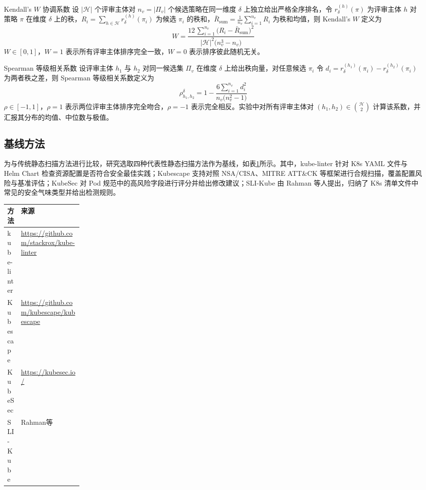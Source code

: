 \begin{flatdefinition}{Kendall's $W$ 协调系数}
\label{def:kendalls-w}
设 $|\mathcal{H}|$ 个评审主体对 $n_v=|\Pi_v|$ 个候选策略在同一维度 $\delta$ 上独立给出严格全序排名，令 $r_{\delta}^{(h)}(\pi)$ 为评审主体 $h$ 对策略 $\pi$ 在维度 $\delta$ 上的秩，$R_i=\sum_{h\in\mathcal{H}}r_{\delta}^{(h)}(\pi_i)$ 为候选 $\pi_i$ 的秩和，$\bar{R}_{\mathrm{sum}}=\frac{1}{n_v}\sum_{i=1}^{n_v}R_i$ 为秩和均值，则 Kendall's $W$ 定义为
\begin{equation}\label{eq:kendalls-w}
W = \frac{12\,\sum_{i=1}^{n_v}\bigl(R_i - \bar{R}_{\mathrm{sum}}\bigr)^{2}}{|\mathcal{H}|^{2}\bigl(n_v^{3}-n_v\bigr)}
\end{equation}
$W\in[0,1]$，$W=1$ 表示所有评审主体排序完全一致，$W=0$ 表示排序彼此随机无关。
\end{flatdefinition}

\begin{flatdefinition}{Spearman 等级相关系数}
\label{def:spearman-rho}
设评审主体 $h_1$ 与 $h_2$ 对同一候选集 $\Pi_v$ 在维度 $\delta$ 上给出秩向量，对任意候选 $\pi_i$ 令 $d_i=r_{\delta}^{(h_1)}(\pi_i)-r_{\delta}^{(h_2)}(\pi_i)$ 为两者秩之差，则 Spearman 等级相关系数定义为
\begin{equation}\label{eq:spearman-rho}
\rho_{h_1,h_2}^{\delta} = 1 - \frac{6\displaystyle\sum_{i=1}^{n_v}d_i^{2}}{n_v\bigl(n_v^{2}-1\bigr)}
\end{equation}
$\rho\in[-1,1]$，$\rho=1$ 表示两位评审主体排序完全吻合，$\rho=-1$ 表示完全相反。实验中对所有评审主体对 $(h_1,h_2)\in\binom{\mathcal{H}}{2}$ 计算该系数，并汇报其分布的均值、中位数与极值。
\end{flatdefinition}

\subsection{基线方法}

为与传统静态扫描方法进行比较，研究选取四种代表性静态扫描方法作为基线，如表\ref{tab:static-tools}所示。其中，kube-linter 针对 K8s YAML 文件与 Helm Chart 检查资源配置是否符合安全最佳实践；Kubescape 支持对照 NSA/CISA、MITRE ATT\&CK 等框架进行合规扫描，覆盖配置风险与基准评估；KubeSec 对 Pod 规范中的高风险字段进行评分并给出修改建议；SLI-Kube 由 Rahman 等人提出，归纳了 K8s 清单文件中常见的安全气味类型并给出检测规则。

\begin{table}[htb]
	\centering{}
	\label{tab:static-tools}
	\renewcommand{\arraystretch}{0.9}
	\setlength{\tabcolsep}{4pt}
	\begin{tabularx}{0.85\linewidth}{>{\raggedright\arraybackslash}p{0.18\linewidth} >{\raggedright\arraybackslash}X}
	\toprule
		\textbf{方法} & \textbf{来源} \\
	\midrule
	kube-linter & \url{https://github.com/stackrox/kube-linter} \\
	Kubescape & \url{https://github.com/kubescape/kubescape} \\
	KubeSec & \url{https://kubesec.io/} \\
	SLI-Kube & Rahman等\cite{k8smanifests2023} \\
	\bottomrule
	\end{tabularx}
\end{table}

